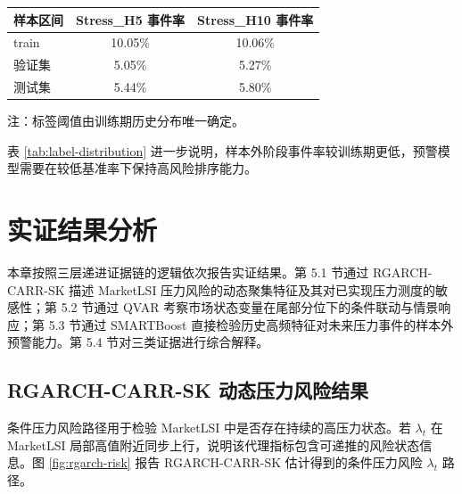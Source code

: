 \documentclass[12pt,a4paper]{ctexart}
\begin{document}
\begin{center}
\begingroup
\captionsetup{type=table}
\begin{minipage}{\textwidth}
\centering
{}
\label{tab:label-distribution}
\small
\begin{threeparttable}
\begin{tabular}{lcc}
\toprule
样本区间 & Stress\_H5 事件率 & Stress\_H10 事件率 \\
\midrule
train & 10.05\% & 10.06\% \\
验证集 & 5.05\% & 5.27\% \\
测试集 & 5.44\% & 5.80\% \\
\bottomrule
\end{tabular}
\begin{tablenotes}[flushleft]
\footnotesize
\item 注：标签阈值由训练期历史分布唯一确定。
\end{tablenotes}
\end{threeparttable}
\end{minipage}
\endgroup
\end{center}

表 \ref{tab:label-distribution} 进一步说明，样本外阶段事件率较训练期更低，预警模型需要在较低基准率下保持高风险排序能力。


\section{实证结果分析}

本章按照三层递进证据链的逻辑依次报告实证结果。第 5.1 节通过 RGARCH-CARR-SK 描述 MarketLSI 压力风险的动态聚集特征及其对已实现压力测度的敏感性；第 5.2 节通过 QVAR 考察市场状态变量在尾部分位下的条件联动与情景响应；第 5.3 节通过 SMARTBoost 直接检验历史高频特征对未来压力事件的样本外预警能力。第 5.4 节对三类证据进行综合解释。

\subsection{RGARCH-CARR-SK 动态压力风险结果}
\label{subsec:rgarch-results}

条件压力风险路径用于检验 MarketLSI 中是否存在持续的高压力状态。若 $\lambda_t$ 在 MarketLSI 局部高值附近同步上行，说明该代理指标包含可递推的风险状态信息。图 \ref{fig:rgarch-risk} 报告 RGARCH-CARR-SK 估计得到的条件压力风险 $\lambda_t$ 路径。
\end{document}
